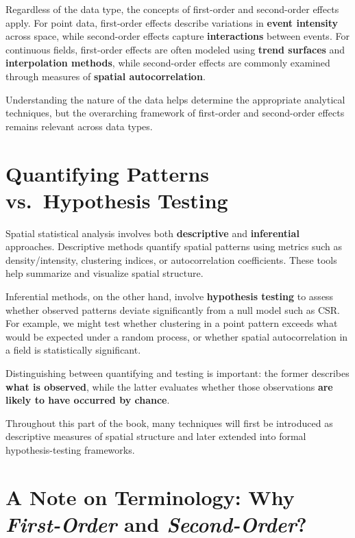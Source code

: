\documentclass[
  letterpaper,
]{book}
\begin{document}
Regardless of the data type, the concepts of first-order and
second-order effects apply. For point data, first-order effects describe
variations in \textbf{event intensity} across space, while second-order
effects capture \textbf{interactions} between events. For continuous
fields, first-order effects are often modeled using \textbf{trend
surfaces} and \textbf{interpolation methods}, while second-order effects
are commonly examined through measures of \textbf{spatial
autocorrelation}.

Understanding the nature of the data helps determine the appropriate
analytical techniques, but the overarching framework of first-order and
second-order effects remains relevant across data types.

\section{Quantifying Patterns vs.~Hypothesis
Testing}\label{quantifying-patterns-vs.-hypothesis-testing}

Spatial statistical analysis involves both \textbf{descriptive} and
\textbf{inferential} approaches. Descriptive methods quantify spatial
patterns using metrics such as density/intensity, clustering indices, or
autocorrelation coefficients. These tools help summarize and visualize
spatial structure.

Inferential methods, on the other hand, involve \textbf{hypothesis
testing} to assess whether observed patterns deviate significantly from
a null model such as CSR. For example, we might test whether clustering
in a point pattern exceeds what would be expected under a random
process, or whether spatial autocorrelation in a field is statistically
significant.

Distinguishing between quantifying and testing is important: the former
describes \textbf{what is observed}, while the latter evaluates whether
those observations \textbf{are likely to have occurred by chance}.

Throughout this part of the book, many techniques will first be
introduced as descriptive measures of spatial structure and later
extended into formal hypothesis-testing frameworks.

\section{\texorpdfstring{A Note on Terminology: Why \emph{First-Order}
and
\emph{Second-Order}?}{A Note on Terminology: Why First-Order and Second-Order?}}\label{a-note-on-terminology-why-first-order-and-second-order}
\end{document}

